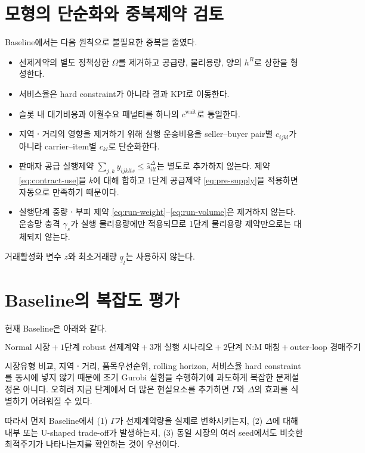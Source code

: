 \documentclass[11pt,a4paper]{article}
\begin{document}
\section{모형의 단순화와 중복제약 검토}

Baseline에서는 다음 원칙으로 불필요한 중복을 줄였다.

\begin{itemize}
\item 선제계약의 별도 정책상한 $\Omega$를 제거하고 공급량, 물리용량, 양의 $h^R$로 상한을 형성한다.
\item 서비스율은 hard constraint가 아니라 결과 KPI로 이동한다.
\item 슬롯 내 대기비용과 이월수요 패널티를 하나의 $c^{\mathrm{wait}}$로 통일한다.
\item 지역ㆍ거리의 영향을 제거하기 위해 실행 운송비용을 seller--buyer pair별 $c_{ijkl}$가 아니라 carrier--item별 $c_{kl}$로 단순화한다.
\item 판매자 공급 실행제약 $\sum_{j,k}y_{ijklts}\le\hat s^\Delta_{ilt}$는 별도로 추가하지 않는다.
제약 \eqref{eq:contract-use}을 $k$에 대해 합하고 1단계 공급제약 \eqref{eq:pre-supply}을 적용하면 자동으로 만족하기 때문이다.
\item 실행단계 중량ㆍ부피 제약 \eqref{eq:run-weight}--\eqref{eq:run-volume}은 제거하지 않는다.
운송망 충격 $\gamma_s$가 실행 물리용량에만 적용되므로 1단계 물리용량 제약만으로는 대체되지 않는다.
\end{itemize}

거래활성화 변수 $z$와 최소거래량 $\underline q_l$는 사용하지 않는다.

\section{Baseline의 복잡도 평가}

현재 Baseline은 아래와 같다.

\[
\boxed{
\text{Normal 시장}
+
\text{1단계 robust 선제계약}
+
\text{3개 실행 시나리오}
+
\text{2단계 N:M 매칭}
+
\text{outer-loop 경매주기}
}
\]

시장유형 비교, 지역ㆍ거리, 품목우선순위, rolling horizon, 서비스율 hard constraint를 동시에 넣지 않기 때문에
초기 Gurobi 실험을 수행하기에 과도하게 복잡한 문제설정은 아니다.
오히려 지금 단계에서 더 많은 현실요소를 추가하면 $\Gamma$와 $\Delta$의 효과를 식별하기 어려워질 수 있다.

따라서 먼저 Baseline에서
(1) $\Gamma$가 선제계약량을 실제로 변화시키는지,
(2) $\Delta$에 대해 내부 또는 U-shaped trade-off가 발생하는지,
(3) 동일 시장의 여러 seed에서도 비슷한 최적주기가 나타나는지를 확인하는 것이 우선이다.
\end{document}
